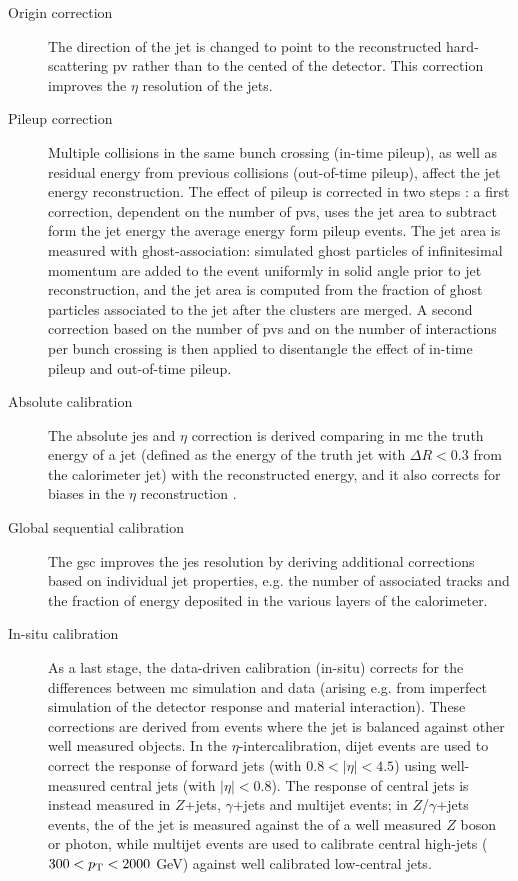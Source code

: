 \begin{description}
\item[Origin correction] The direction of the jet is changed to point to the reconstructed hard-scattering \gls{pv} rather than to the cented of the detector. This correction improves the $\eta$ resolution of the jets.

\item[Pileup correction] Multiple collisions in the same bunch crossing (in-time pileup), as well as residual energy from previous collisions (out-of-time pileup), affect the jet energy reconstruction. The effect of pileup is corrected in two steps 
\cite{Cacciari:2007fd,ATLAS-CONF-2013-083}: a first correction, dependent on the number of \glspl{pv}, uses the jet area to subtract form the jet energy the average energy form pileup events. 
The jet area is measured with ghost-association: simulated ghost particles of infinitesimal momentum are added to the event uniformly in solid angle prior to jet reconstruction, and the jet area is computed from the fraction of ghost particles associated to the jet after the clusters are merged. 
A second correction based on the number of \glspl{pv} and on the number of interactions per bunch crossing is then applied to disentangle the effect of in-time pileup and out-of-time pileup.

\item[Absolute calibration] The absolute \gls{jes} and $\eta$ correction is derived comparing in \gls{mc} the truth energy of a jet 
(defined as the energy of the truth jet with $\Delta R<0.3$ from the calorimeter jet) 
with the reconstructed energy, and it also corrects for biases in the $\eta$ reconstruction \cite{Aad2015jets}.

\item[Global sequential calibration] The \gls{gsc} \cite{ATLAS-CONF-2015-002} improves the \gls{jes} resolution by deriving additional corrections based on individual jet properties, e.g. the number of associated tracks and the fraction of energy deposited in the various layers of the calorimeter.

\item[In-situ calibration] As a last stage, the data-driven calibration (in-situ) \cite{ATLAS-CONF-2015-017} corrects for the differences between \gls{mc} simulation and data (arising e.g. from imperfect simulation of the detector response and material interaction). These corrections are derived from events where the jet \pt is balanced against other well measured objects. In the $\eta$-intercalibration, dijet events are used to correct the response of forward jets (with $0.8 < |\eta| < 4.5$) using well-measured central jets (with $|\eta| < 0.8$). 
The response of central jets is instead measured in $Z$+jets, $\gamma$+jets and multijet events; 
in $Z$/$\gamma$+jets events, the \pt of the jet is measured against the \pt of a well measured $Z$ boson or photon, while 
multijet events are used to calibrate central high-\pt jets ($300 < p_{\rm T} < 2000$ GeV) against 
well calibrated low-\pt central jets. 
 
\end{description}

